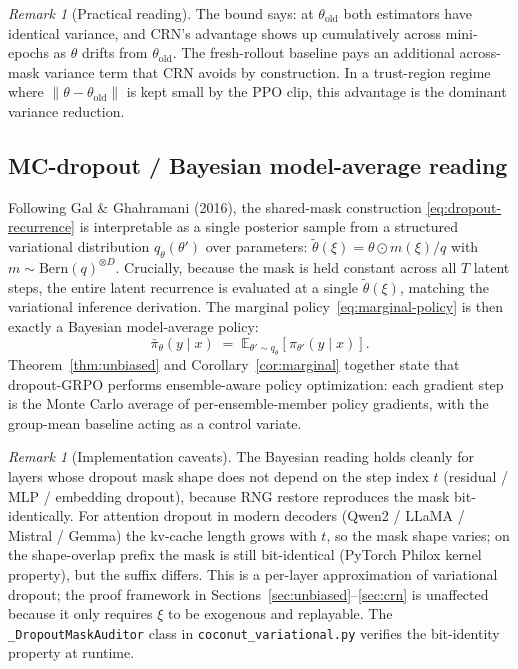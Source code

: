 \documentclass[11pt]{article}
\theoremstyle{definition}
\theoremstyle{remark}
\newtheorem{remark}[theorem]{Remark}
\newcommand{\E}{\mathbb{E}}
\newcommand{\old}{\mathrm{old}}
\begin{document}
\begin{remark}[Practical reading]
The bound says: at $\theta_\old$ both estimators have identical variance,
and CRN's advantage shows up cumulatively across mini-epochs as $\theta$
drifts from $\theta_\old$.  The fresh-rollout baseline pays an additional
across-mask variance term that CRN avoids by construction.  In a
trust-region regime where $\|\theta - \theta_\old\|$ is kept small by the
PPO clip, this advantage is the dominant variance reduction.
\end{remark}

\subsection{MC-dropout / Bayesian model-average reading}
\label{sec:mc-dropout}

Following Gal \& Ghahramani (2016), the shared-mask construction
\eqref{eq:dropout-recurrence} is interpretable as a single posterior
sample from a structured variational distribution $q_\theta(\theta')$ over
parameters: $\tilde\theta(\xi) = \theta\odot m(\xi)/q$ with
$m \sim \mathrm{Bern}(q)^{\otimes D}$.  Crucially, because the mask is held
constant across all $T$ latent steps, the entire latent recurrence is
evaluated at a single $\tilde\theta(\xi)$, matching the variational
inference derivation.  The marginal policy~\eqref{eq:marginal-policy} is
then exactly a Bayesian model-average policy:
\begin{equation}
\bar\pi_\theta(y\mid x)
  \;=\;
\E_{\theta'\sim q_\theta}[\pi_{\theta'}(y\mid x)].
\label{eq:bma}
\end{equation}
Theorem~\ref{thm:unbiased} and Corollary~\ref{cor:marginal} together state
that dropout-GRPO performs ensemble-aware policy optimization: each
gradient step is the Monte Carlo average of per-ensemble-member policy
gradients, with the group-mean baseline acting as a control variate.

\begin{remark}[Implementation caveats]
The Bayesian reading holds cleanly for layers whose dropout mask shape
does not depend on the step index $t$ (residual / MLP / embedding
dropout), because RNG restore reproduces the mask bit-identically.  For
attention dropout in modern decoders (Qwen2 / LLaMA / Mistral / Gemma)
the kv-cache length grows with $t$, so the mask shape varies; on the
shape-overlap prefix the mask is still bit-identical (PyTorch Philox
kernel property), but the suffix differs.  This is a per-layer
approximation of variational dropout; the proof framework in
Sections~\ref{sec:unbiased}--\ref{sec:crn} is unaffected because it only
requires $\xi$ to be exogenous and replayable.  The
\texttt{\_DropoutMaskAuditor} class in \texttt{coconut\_variational.py}
verifies the bit-identity property at runtime.
\end{remark}
\end{document}
